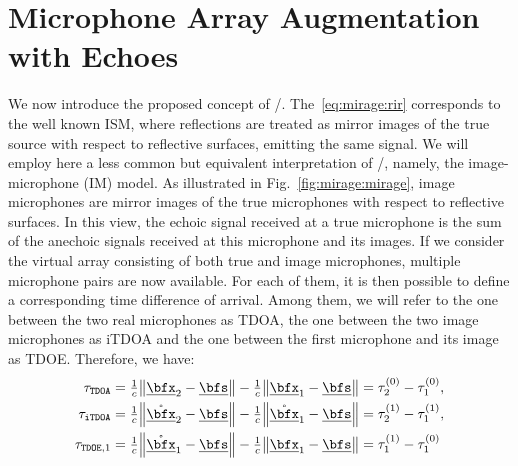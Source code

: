 \section{Microphone Array Augmentation with Echoes}\label{sec:mirage:mirage}
We now introduce the proposed concept of \MIRAGEdef/.
The~\cref{eq:mirage:rir} corresponds to the well known \acf{ISM}, where reflections are treated as mirror images of the true source with respect to reflective surfaces, emitting the same signal.
We will employ here a less common but equivalent interpretation of \ISM/, namely, the image-microphone (IM) model. As illustrated in Fig.~\cref{fig:mirage:mirage}, image microphones are mirror images of the true microphones with respect to reflective surfaces.
In this view, the echoic signal received at a true microphone is the sum of the anechoic signals received at this microphone and its images.
If we consider the virtual array consisting of both true and image microphones, multiple microphone pairs are now available. For each of them, it is then possible to define a corresponding time difference of arrival.
Among them, we will refer to the one between the two real microphones as \ac{TDOA}, the one between the two image microphones as \ac{iTDOA} and the one between the first microphone and its image as \ac{TDOE}.
Therefore, we have:%
\begin{align}
\tau_\mathtt{TDOA}  &= \tfrac{1}{c} \norm{\positionMicrophone_2 - \positionSource} - \tfrac{1}{c} \norm{\positionMicrophone_1 - \positionSource} = \tau_2^{(0)} - \tau_1^{(0)},\\
\tau_\mathtt{iTDOA} &= \tfrac{1}{c} \norm{\mathring{\positionMicrophone}_2 - \positionSource} - \tfrac{1}{c} \norm{\mathring{\positionMicrophone}_1 - \positionSource} = \tau_2^{(1)} - \tau_1^{(1)},\\
\tau_{\mathtt{TDOE},1}  &= \tfrac{1}{c} \norm{\mathring{\positionMicrophone}_1 - \positionSource} - \tfrac{1}{c} \norm{\positionMicrophone_1 - \positionSource} = \tau_1^{(1)} - \tau_1^{(0)}
\end{align}
